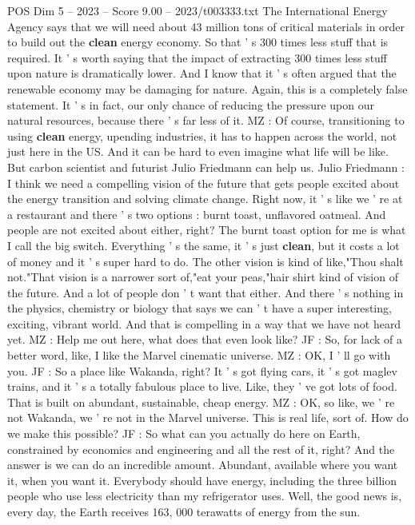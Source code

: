 \begin{textsample}{POS Dim 5 – 2023 – Score 9.00 – 2023/t003333.txt}
The International Energy Agency says that we will need about 43 million tons of critical materials in order to build out the \textbf{clean} energy economy.
So that ' s 300 times less stuff that is required.
It ' s worth saying that the impact of extracting 300 times less stuff upon nature is dramatically lower.
And I know that it ' s often argued that the renewable economy may be damaging for nature.
Again, this is a completely false statement.
It ' s in fact, our only chance of reducing the pressure upon our natural resources, because there ' s far less of it.
MZ : Of course, transitioning to using \textbf{clean} energy, upending industries, it has to happen across the world, not just here in the US.
And it can be hard to even imagine what life will be like.
But carbon scientist and futurist Julio Friedmann can help us.
Julio Friedmann : I think we need a compelling vision of the future that gets people excited about the energy transition and solving climate change.
Right now, it ' s like we ' re at a restaurant and there ' s two options : burnt toast, unflavored oatmeal.
And people are not excited about either, right?
The burnt toast option for me is what I call the big switch.
Everything ' s the same, it ' s just \textbf{clean}, but it costs a lot of money and it ' s super hard to do.
The other vision is kind of like,"Thou shalt not."That vision is a narrower sort of,"eat your peas,"hair shirt kind of vision of the future.
And a lot of people don ' t want that either.
And there ' s nothing in the physics, chemistry or biology that says we can ' t have a super interesting, exciting, vibrant world.
And that is compelling in a way that we have not heard yet.
MZ : Help me out here, what does that even look like?
JF : So, for lack of a better word, like, I like the Marvel cinematic universe.
MZ : OK, I ' ll go with you.
JF : So a place like Wakanda, right?
It ' s got flying cars, it ' s got maglev trains, and it ' s a totally fabulous place to live.
Like, they ' ve got lots of food.
That is built on abundant, sustainable, cheap energy.
MZ : OK, so like, we ' re not Wakanda, we ' re not in the Marvel universe.
This is real life, sort of.
How do we make this possible?
JF : So what can you actually do here on Earth, constrained by economics and engineering and all the rest of it, right?
And the answer is we can do an incredible amount.
Abundant, available where you want it, when you want it.
Everybody should have energy, including the three billion people who use less electricity than my refrigerator uses.
Well, the good news is, every day, the Earth receives 163, 000 terawatts of energy from the sun.

\end{textsample}
